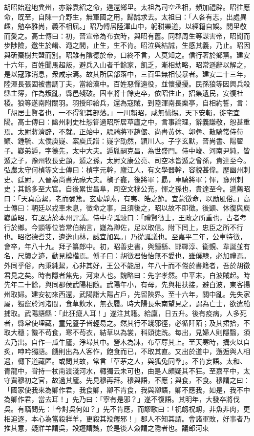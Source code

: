 \begin{pinyinscope}
胡昭始避地兾州，亦辭袁紹之命，遁還鄉里。太祖為司空丞相，頻加禮辟。昭往應命，旣至，自陳一介野生，無軍國之用，歸誠求去。太祖曰：「人各有志，出處異趣，勉卒雅尚，義不相屈。」昭乃轉居陸渾山中，躬耕樂道，以經籍自娛。閭里敬而愛之。高士傳曰：初，晉宣帝為布衣時，與昭有舊。同郡周生等謀害帝，昭聞而步陟險，邀生於崤、澠之間，止生，生不肯。昭泣與結誠，生感其義，乃止。昭因與斫棗樹共盟而別。昭雖有陰德於帝，口終不言，人莫知之。信行著於鄉黨。建安十六年，百姓聞馬超叛，避兵入山者千餘家，飢乏，漸相劫略，昭常遜辭以解之，是以寇難消息，衆咸宗焉。故其所居部落中，三百里無相侵暴者。建安二十三年，陸渾長張固被書調丁夫，當給漢中。百姓惡憚遠役，並懷擾擾。民孫狼等因興兵殺縣主簿，作為叛亂，縣邑殘破。固率將十餘吏卒，依昭住止，招集遺民，安復社稷。狼等遂南附關羽。羽授印給兵，還為寇賊，到陸渾南長樂亭，自相約誓，言：「胡居士賢者也，一不得犯其部落。」一川賴昭，咸無怵惕。天下安輯，徙宅宜陽。高士傳曰：幽州刺史杜恕甞過昭所居草廬之中，言事論理，辭義謙敬，恕甚重焉。太尉蔣濟辟，不就。正始中，驃騎將軍趙儼、尚書黃休、郭彝、散騎常侍荀顗、鍾毓、太僕庾嶷、案庾氏譜：嶷字劭然，頴川人。子字玄默，晉尚書、陽翟子。嶷弟遁，字德先，太中大夫。遁胤嗣克昌，為世盛門。侍中峻、河南尹純，皆遁之子，豫州牧長史顗，遁之孫，太尉文康公亮、司空冰皆遁之曾孫，貴達至今。弘農太守何楨等文士傳曰：楨字元幹，廬江人，有文學器幹，容貌甚偉。歷幽州刺史、廷尉，入晉為尚書光祿大夫。楨子龕，後將軍；勗，車騎將軍；惲，豫州刺史；其餘多至大官。自後累世昌阜，司空文穆公充，惲之孫也，貴達至今。遞薦昭曰：「天真高絜，老而彌篤。玄虛靜素，有夷、皓之節。宜蒙徵命，以勵風俗。」高士傳曰：朝廷以戎車未息，徵命之事，且須後之，昭以故不即徵。後顗、休復與庾嶷薦昭，有詔訪於本州評議。侍中韋誕駮曰：「禮賢徵士，王政之所重也，古者考行於鄉。今顗等位皆常伯納言，嶷為卿佐，足以取信。附下罔上，忠臣之所不行也。昭宿德耆艾，遺逸山林，誠宜加異。」乃從誕議也。至嘉平二年，公車特徵，會卒，年八十九。拜子纂郎中。初，昭善史書，與鍾繇、邯鄲淳、衞覬、韋誕並有名，尺牘之迹，動見模楷焉。傅子曰：胡徵君怡怡無不愛也，雖僕隷，必加禮焉。外同乎俗，內秉純絜，心非其好，王公不能屈，年八十而不倦於書籍者，吾於胡徵君見之矣。時有隱者焦先，河東人也。魏略曰：先字孝然。中平末，白波賊起。時先年二十餘，與同郡侯武陽相隨。武陽年小，有母，先與相扶接，避白波，東客揚州取婦。建安初來西還，武陽詣大陽占戶，先留陝界。至十六年，關中亂。先失家屬，獨竄於河渚間，食草飲水，無衣履。時大陽長朱南望見之，謂為亡士，欲遣船捕取。武陽語縣：「此狂癡人耳！」遂注其籍。給廩，日五升。後有疫病，人多死者，縣常使埋藏，童兒豎子皆輕易之。然其行不踐邪徑，必循阡陌；及其捃拾，不取大穗；饑不苟食，寒不苟衣，結草以為裳，科頭徒跣。每出，見婦人則隱翳，須去乃出。自作一瓜牛廬，淨埽其中。營木為牀，布草蓐其上。至天寒時，搆火以自炙，呻吟獨語。饑則出為人客作，飽食而已，不取其直。又出於道中，邂逅與人相遇，輙下道藏匿。或問其故，常言「草茅之人，與狐兔同羣」。不肯妄語。太和、青龍中，甞持一杖南渡淺河水，輙獨云未可也，由是人頗疑其不狂。至嘉平中，太守賈穆初之官，故過其廬。先見穆再拜。穆與語，不應；與食，不食。穆謂之曰：「國家使我來為卿作君，我食卿，卿不肯食，我與卿語，卿不應我，如是，我不中為卿作君，當去耳！」先乃曰：「寧有是邪？」遂不復語。其明年，大發卒將伐吳。有竊問先：「今討吳何如？」先不肯應，而謬歌曰：「祝衂祝衂，非魚非肉，更相追逐，本心為當殺牂羊，更殺其羖䍽邪！」郡人不知其謂。會諸軍敗，好事者乃推其意，疑牂羊謂吳，羖䍽謂魏，於是後人僉謂之隱者也。議郎河東
\end{pinyinscope}
